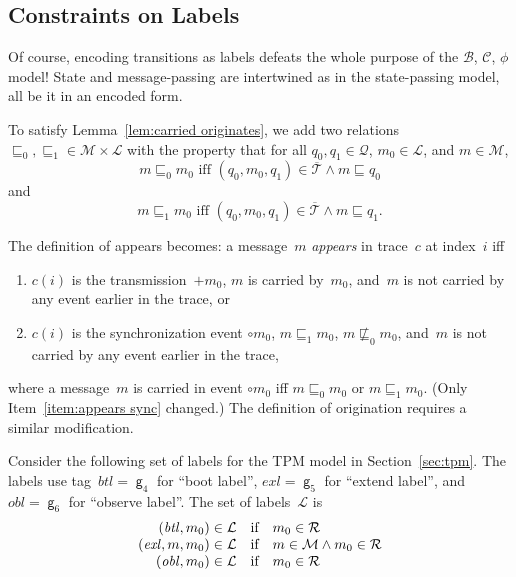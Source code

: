 \documentclass[12pt]{article}
\newcommand{\cn}[1]{\ensuremath{\operatorname{\mathsf{#1}}}}
\newcommand{\gtag}[1]{\ensuremath{\mathit{#1}}}
\newcommand{\outbnd}{\mathord +}
\newcommand{\neutral}{\mathord\circ}
\newcommand{\msg}{\ensuremath{\mathcal{M}}}
\newcommand{\bun}{\ensuremath{\mathcal{B}}}
\newcommand{\sta}{\ensuremath{\mathcal{Q}}}
\newcommand{\tran}{\ensuremath{\mathcal{T}}}
\newcommand{\eran}{\ensuremath{\mathcal{R}}}
\newcommand{\comp}{\ensuremath{\mathcal{C}}}
\newcommand{\lab}{\ensuremath{\mathcal{L}}}
\newcommand{\cbar}[1]{\ensuremath{\overline{#1}}}
\begin{document}
\subsection{Constraints on Labels}\label{sec:constraints on labels}

Of course, encoding transitions as labels defeats the whole purpose of
the \bun, \comp, $\phi$ model!  State and message-passing are
intertwined as in the state-passing model, all be it in an encoded
form.

To satisfy Lemma~\ref{lem:carried originates}, we add two relations
${\sqsubseteq_0,\sqsubseteq_1}\in\msg\times\lab$ with the property
that
for all $q_0,q_1\in\sta$, $m_0\in\lab$, and $m\in\msg$,
\begin{equation}\label{eq:sqsubseteq0}
m\sqsubseteq_0m_0\mbox{ iff }(q_0,m_0,q_1)\in\cbar{\tran}\land
m\sqsubseteq q_0
\end{equation}
and
\begin{equation}\label{eq:sqsubseteq1}
m\sqsubseteq_1m_0\mbox{ iff }(q_0,m_0,q_1)\in\cbar{\tran}\land
m\sqsubseteq q_1.
\end{equation}

The definition of appears becomes: a message~$m$ \emph{appears} in
trace~$c$ at index~$i$ iff
\begin{enumerate}
\item $c(i)$ is the transmission~$\outbnd m_0$, $m$ is carried
  by~$m_0$, and~$m$ is not carried by any event earlier in the trace,
  or
\item\label{item:appears sync} $c(i)$ is the synchronization event
  $\neutral m_0$, $m\sqsubseteq_1 m_0$, $m\not\sqsubseteq_0 m_0$,
  and~$m$ is not carried by any event earlier in the trace,
\end{enumerate}
where a message~$m$ is carried in event $\neutral m_0$ iff
$m\sqsubseteq_0 m_0$ or $m\sqsubseteq_1 m_0$.  (Only
Item~\ref{item:appears sync} changed.)  The definition of origination
requires a similar modification.

Consider the following set of labels for the TPM model in
Section~\ref{sec:tpm}.  The labels use tag~$\gtag{btl}=\cn{g}_4$ for
``boot label'', $\gtag{exl}=\cn{g}_5$ for ``extend label'', and
$\gtag{obl}=\cn{g}_6$ for ``observe label''.  The set of labels~{\lab}
is
\[\begin{array}{r@{{}\in\lab\quad\mbox{if}\quad}l}
(\gtag{btl},m_0)&m_0\in\eran\\
(\gtag{exl},m,m_0)&m\in\msg\land m_0\in\eran\\
(\gtag{obl},m_0)&m_0\in\eran
\end{array}\]
\end{document}
